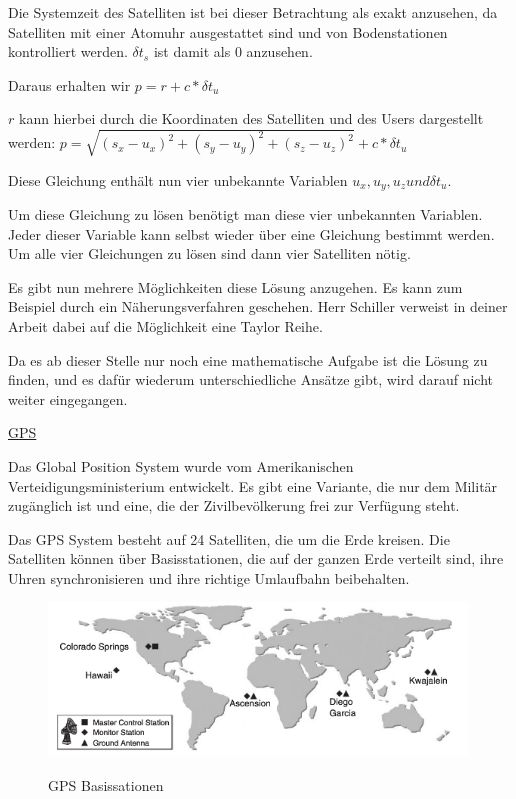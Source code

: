 Die Systemzeit des Satelliten ist bei dieser Betrachtung als exakt anzusehen, da Satelliten mit einer Atomuhr ausgestattet sind und von Bodenstationen kontrolliert werden. $\delta t_{s}$ ist damit als 0 anzusehen.

Daraus erhalten wir $p = r + c * \delta t_{u}$

$r$ kann hierbei durch die Koordinaten des Satelliten und des Users dargestellt werden: $p = \sqrt{(s_{x} - u_{x})^{2} + (s_{y} - u_{y})^{2} + (s_{z}-u_{z})^{2}} + c * \delta t_{u}$

Diese Gleichung enthält nun vier unbekannte Variablen $u_{x}, u_{y}, u_{z} und \delta t_{u}$. 

Um diese Gleichung zu lösen benötigt man diese vier unbekannten Variablen. Jeder dieser Variable kann selbst wieder über eine Gleichung bestimmt werden. Um alle vier Gleichungen zu lösen sind dann vier Satelliten nötig. 

Es gibt nun mehrere Möglichkeiten diese Lösung anzugehen. Es kann zum Beispiel durch ein Näherungsverfahren geschehen. Herr Schiller verweist in deiner Arbeit dabei auf die Möglichkeit eine Taylor Reihe.

Da es ab dieser Stelle nur noch eine mathematische Aufgabe ist die Lösung zu finden, und es dafür wiederum unterschiedliche Ansätze gibt, wird darauf nicht weiter eingegangen.
\cite[S. 190]{Schiller2004}


\underline{GPS}

Das Global Position System wurde vom Amerikanischen Verteidigungsministerium entwickelt. Es gibt eine Variante, die nur dem Militär zugänglich ist und eine, die der Zivilbevölkerung frei zur Verfügung steht. 

Das GPS System besteht auf 24 Satelliten, die um die Erde kreisen. Die Satelliten können über Basisstationen, die auf der ganzen Erde verteilt sind, ihre Uhren synchronisieren und ihre richtige Umlaufbahn beibehalten. 
\cite[S. 162]{Kuepper2005}


\begin{figure}[h]
\centering
\includegraphics[width=0.99\textwidth]{ref/images/GPS_Basisstation.PNG}
\caption[GPS Basissationen]{GPS Basissationen}
\label{fig:GPS Basissationen}
\cite[S. 163]{Kuepper2005}
\end{figure}

